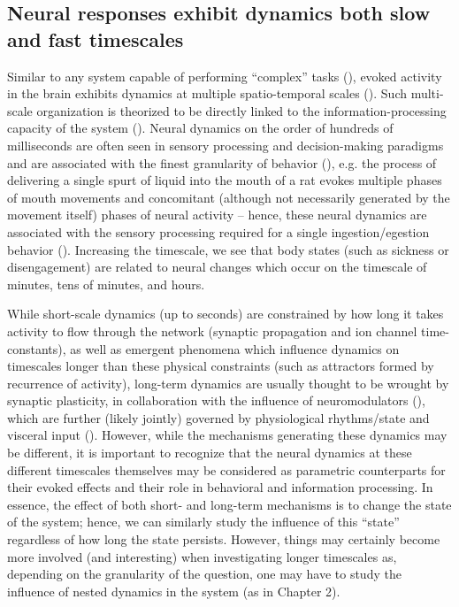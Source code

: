 \begin{refsection}
\section{Neural responses exhibit dynamics both slow and fast timescales}
Similar to any system capable of performing “complex” tasks (\cite{garcia1993a,cash2006a,tao2009a,hekstra2012a,frentz2015a,leong2016a,ribeiro2021a,graumann2022a,jonas2017a}), evoked activity in the brain exhibits dynamics at multiple spatio-temporal scales (\cite{engel2013a,tomasi2017a,kaplan2020a,raut2020a}). Such multi-scale organization is theorized to be directly linked to the information-processing capacity of the system (\cite{tononi2016a,mediano2022a}).  Neural dynamics on the order of hundreds of milliseconds are often seen in sensory processing and decision-making paradigms and are associated with the finest granularity of behavior (\cite{guo2014a,guo2015a,markowitz2018a,kaplan2020a,rastogi2020a,vincis2020a}), e.g. the process of delivering a single spurt of liquid into the mouth of a rat evokes multiple phases of mouth movements and concomitant (although not necessarily generated by the movement itself) phases of neural activity – hence, these neural dynamics are associated with the sensory processing required for a single ingestion/egestion behavior (\cite{sadacca2016a,mukherjee2019a}). Increasing the timescale, we see that body states (such as sickness or disengagement) are related to neural changes which occur on the timescale of minutes, tens of minutes, and hours.

While short-scale dynamics (up to seconds) are constrained by how long it takes activity to flow through the network (synaptic propagation and ion channel time-constants), as well as emergent phenomena which influence dynamics on timescales longer than these physical constraints (such as attractors formed by recurrence of activity), long-term dynamics are usually thought to be wrought by synaptic plasticity, in collaboration with the influence of neuromodulators (\cite{abarbanel2001a,abarbanel2002a,yasumatsu2008a,odonnell2011a,bazzari2019a,deperrois2020a}), which are further (likely jointly) governed by physiological rhythms/state and visceral input (\cite{critchley1996a,critchley2015a,ly2016a,azzalini2019a,paul2020a,candia-rivera2022a}). However, while the mechanisms generating these dynamics may be different, it is important to recognize that the neural dynamics at these different timescales themselves may be considered as parametric counterparts for their evoked effects and their role in behavioral and information processing. In essence, the effect of both short- and long-term mechanisms is to change the state of the system; hence, we can similarly study the influence of this “state” regardless of how long the state persists. However, things may certainly become more involved (and interesting) when investigating longer timescales as, depending on the granularity of the question, one may have to study the influence of nested dynamics in the system (as in Chapter 2).


\end{refsection}
